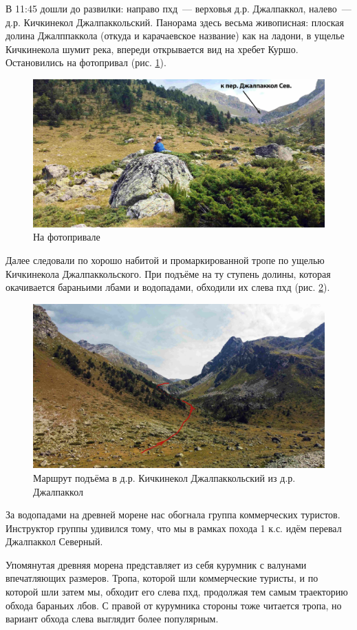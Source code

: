 В 11:45 дошли до развилки: направо пхд~--- верховья д.р. Джалпаккол, налево~--- д.р. Кичкинекол Джалпаккольский. Панорама здесь весьма живописная: плоская долина Джалппаккола (откуда и карачаевское название) как на ладони, в ущелье Кичкинекола шумит река, впереди открывается вид на хребет Куршо. Остановились на фотопривал (рис. \ref{fig:DJI_0830}).

\begin{figure}[h!]
	\centering
	\includegraphics[width=0.7\linewidth]{../pics/DJI_0830}
	\caption{На фотопривале}
	\label{fig:DJI_0830}
\end{figure}

Далее следовали по хорошо набитой и промаркированной тропе по ущелью Кичкинекола Джалпаккольского. При подъёме на ту ступень долины, которая окачивается бараньими лбами и водопадами, обходили их слева пхд (рис. \ref{fig:DJI_0835}).


\begin{figure}[h!]
	\centering
	\includegraphics[width=0.7\linewidth]{../pics/DJI_0835}
	\caption{Маршрут подъёма в д.р. Кичкинекол Джалпаккольский из д.р. Джалпаккол}
	\label{fig:DJI_0835}
\end{figure}

За водопадами на древней морене нас обогнала группа коммерческих туристов. Инструктор группы удивился тому, что мы в рамках похода 1 к.с. идём перевал Джалпаккол Северный. 

Упомянутая древняя морена представляет из себя курумник с валунами впечатляющих размеров. Тропа, которой шли коммерческие туристы, и по которой шли затем мы, обходит его слева пхд, продолжая тем самым траекторию обхода бараньих лбов. С правой от курумника стороны тоже читается тропа, но вариант обхода слева выглядит более популярным.

